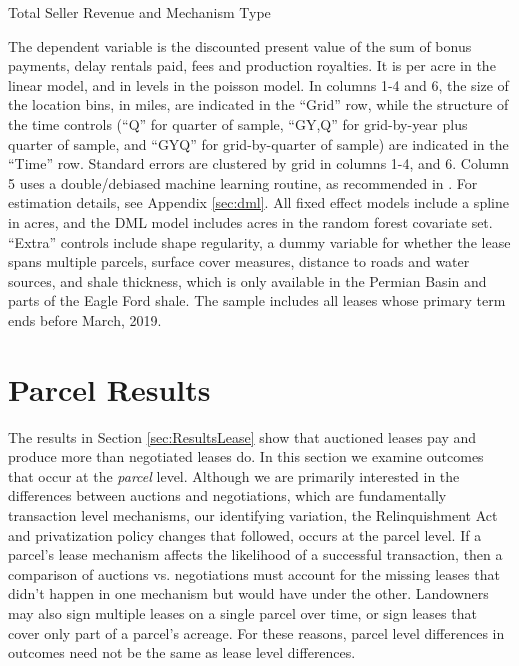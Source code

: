 \documentclass[12pt]{article}
\begin{document}
\addtolength{\tabcolsep}{6pt}
\begin{table}[H]
	\begin{center}
	\begin{threeparttable}
	\caption{Total Seller Revenue and Mechanism Type}
	\label{tab:level_revenues}
	\small
	            
		\begin{tablenotes}
		\footnotesize
		\item The dependent variable is the discounted present value of the sum of bonus payments, delay rentals paid, fees and production royalties.  It is per acre in the linear model, and in levels in the poisson model.  In columns 1-4 and 6, the size of the location bins, in miles, are indicated in the ``Grid'' row, while the structure of the time controls (``Q'' for quarter of sample, ``GY,Q'' for grid-by-year plus quarter of sample, and ``GYQ'' for grid-by-quarter of sample) are indicated in the ``Time'' row.  Standard errors are clustered by grid in columns 1-4, and 6.  Column 5 uses a double/debiased machine learning routine, as recommended in  \cite{chernozhukov2018double}.  For estimation details, see Appendix \ref{sec:dml}.  All fixed effect models include a spline in acres, and the DML model includes acres in the random forest covariate set.  ``Extra'' controls include shape regularity, a dummy variable for whether the lease spans multiple parcels, surface cover measures, distance to roads and water sources, and shale thickness, which is only available in the Permian Basin and parts of the Eagle Ford shale.  The sample includes all leases whose primary term ends before March, 2019.      
		\end{tablenotes}	   
	\end{threeparttable}
	\end{center}
\end{table}
\addtolength{\tabcolsep}{-6pt}

\section{Parcel Results \label{sec:ResultsParcels}}

The results in Section \ref{sec:ResultsLease} show that auctioned leases pay and produce more than negotiated leases do. In this section we examine outcomes that occur at the \textit{parcel} level. Although we are primarily interested in the differences between auctions and negotiations, which are fundamentally transaction level mechanisms, our identifying variation, the Relinquishment Act and privatization policy changes that followed, occurs at the parcel level.  If a parcel's lease mechanism affects the likelihood of a successful transaction, then a comparison of auctions vs. negotiations must account for the missing leases that didn't happen in one mechanism but would have under the other. Landowners may also sign multiple leases on a single parcel over time, or sign leases that cover only part of a parcel's acreage. For these reasons, parcel level differences in outcomes need not be the same as lease level differences.
 
\end{document}
